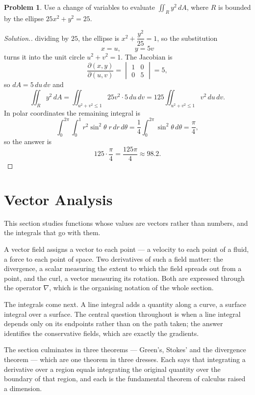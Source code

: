 \documentclass[11pt,a4paper]{article}
\theoremstyle{definition}
\newtheorem{problemx}{Problem}[subsection]
\newenvironment{problem}{\begin{problemx}}{\end{problemx}}
\newenvironment{solution}
  {\renewcommand{\qedsymbol}{}\begin{proof}[\textit{Solution}.]}
  {\end{proof}}
\begin{document}
\begin{problem}
Use a change of variables to evaluate $\displaystyle{\iint_R y^2\,dA}$, where
$R$ is bounded by the ellipse $25x^2+y^2 = 25$.
\end{problem}
\begin{solution}
dividing by $25$, the ellipse is $x^2+\dfrac{y^2}{25} = 1$, so the substitution
\[x = u,\qquad y = 5v\]
turns it into the unit circle $u^2+v^2 = 1$. The Jacobian is
\[\frac{\partial(x,y)}{\partial(u,v)}
= \begin{vmatrix}1 & 0\\ 0 & 5\end{vmatrix} = 5 ,\]
so $dA = 5\,du\,dv$ and
\[\iint_R y^2\,dA = \iint_{u^2+v^2\leq 1}25v^2\cdot 5\,du\,dv
= 125\iint_{u^2+v^2\leq 1}v^2\,du\,dv .\]
In polar coordinates the remaining integral is
\[\int_0^{2\pi}\int_0^1 r^2\sin^2\theta\;r\,dr\,d\theta
= \frac14\int_0^{2\pi}\sin^2\theta\,d\theta = \frac{\pi}{4},\]
so the answer is
\[125\cdot\frac{\pi}{4} = \frac{125\pi}{4}\approx 98.2 .\]
\end{solution}


{\color[wave]{485}\section{Vector Analysis}}

This section studies functions whose values are vectors rather than numbers, and
the integrals that go with them.

A vector field assigns a vector to each point --- a velocity to each point of a
fluid, a force to each point of space. Two derivatives of such a field matter:
the divergence, a scalar measuring the extent to which the field spreads out from
a point, and the curl, a vector measuring its rotation. Both are expressed
through the operator $\nabla$, which is the organising notation of the whole
section.

The integrals come next. A line integral adds a quantity along a curve, a
surface integral over a surface. The central question throughout is when a line
integral depends only on its endpoints rather than on the path taken; the answer
identifies the conservative fields, which are exactly the gradients.

The section culminates in three theorems --- Green's, Stokes' and the divergence
theorem --- which are one theorem in three dresses. Each says that integrating a
derivative over a region equals integrating the original quantity over the
boundary of that region, and each is the fundamental theorem of calculus raised
a dimension.
\end{document}
